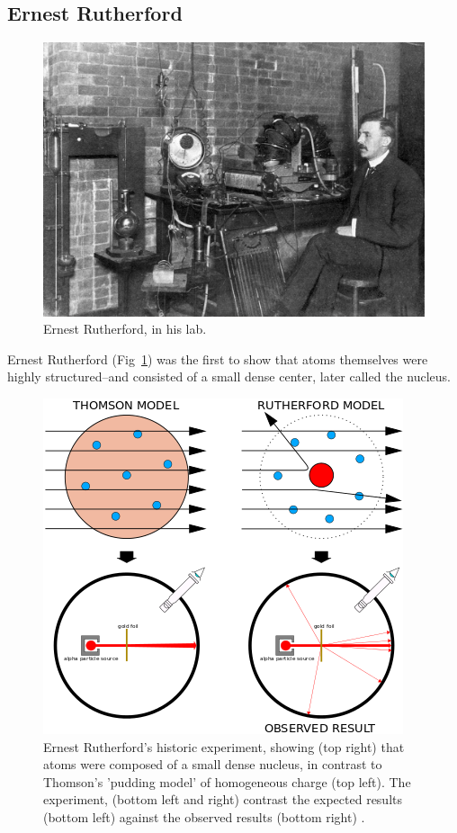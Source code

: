 \subsection{Ernest Rutherford}

\begin{figure}[ht]
	\centering
	\includegraphics[width=0.6\linewidth]{./figures/ernestrutherford.jpg}
	\caption{Ernest Rutherford, in his lab.  \cite{Eve1939}}
	\label{fig:rutherford}
\end{figure}

Ernest Rutherford (Fig~\ref{fig:rutherford}) was the first to show that atoms
themselves were highly structured--and consisted of a small dense center, later
called the nucleus.

\begin{figure}[ht]
	\centering
	\includegraphics[width=0.6\linewidth]{./figures/geiger_marsden.png}
	\caption{
		Ernest Rutherford's historic experiment, showing (top right) that atoms were
		composed of a small dense nucleus, in contrast to Thomson's 'pudding model'
		of homogeneous charge (top left). The experiment, (bottom left and right)
		contrast the expected results (bottom left) against the observed results
		(bottom right)  \cite{Kurzon2014}.
	}
	\label{fig:geigermarsden}
\end{figure}

